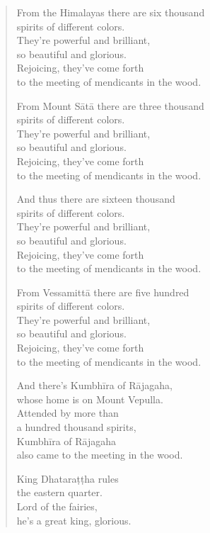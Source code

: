 \documentclass[12pt,openany]{book}%
\begin{document}
\begin{verse}
From the Himalayas there are six thousand \\
spirits of different colors. \\
They’re powerful and brilliant, \\
so beautiful and glorious. \\
Rejoicing, they’ve come forth \\
to the meeting of mendicants in the wood. 

From Mount \textsanskrit{Sātā} there are three thousand \\
spirits of different colors. \\
They’re powerful and brilliant, \\
so beautiful and glorious. \\
Rejoicing, they’ve come forth \\
to the meeting of mendicants in the wood. 

And thus there are sixteen thousand \\
spirits of different colors. \\
They’re powerful and brilliant, \\
so beautiful and glorious. \\
Rejoicing, they’ve come forth \\
to the meeting of mendicants in the wood. 

From \textsanskrit{Vessamittā} there are five hundred \\
spirits of different colors. \\
They’re powerful and brilliant, \\
so beautiful and glorious. \\
Rejoicing, they’ve come forth \\
to the meeting of mendicants in the wood. 

And there’s \textsanskrit{Kumbhīra} of \textsanskrit{Rājagaha}, \\
whose home is on Mount Vepulla. \\
Attended by more than \\
a hundred thousand spirits, \\
\textsanskrit{Kumbhīra} of \textsanskrit{Rājagaha} \\
also came to the meeting in the wood. 

King \textsanskrit{Dhataraṭṭha} rules \\
the eastern quarter. \\
Lord of the fairies, \\
he’s a great king, glorious. 


\end{verse}
\end{document}
